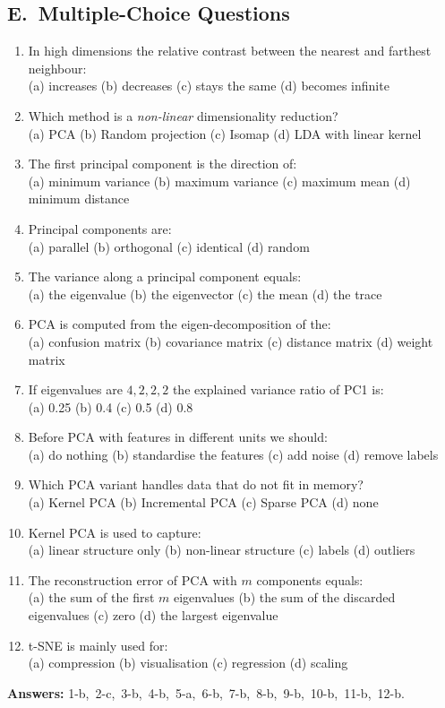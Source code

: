 \subsection*{E.\ Multiple-Choice Questions}
\begin{enumerate}
  \item In high dimensions the relative contrast between the nearest and farthest neighbour: \\
  (a) increases \quad (b) decreases \quad (c) stays the same \quad (d) becomes infinite
  \item Which method is a \emph{non-linear} dimensionality reduction? \\
  (a) PCA \quad (b) Random projection \quad (c) Isomap \quad (d) LDA with linear kernel
  \item The first principal component is the direction of: \\
  (a) minimum variance \quad (b) maximum variance \quad (c) maximum mean \quad (d) minimum distance
  \item Principal components are: \\
  (a) parallel \quad (b) orthogonal \quad (c) identical \quad (d) random
  \item The variance along a principal component equals: \\
  (a) the eigenvalue \quad (b) the eigenvector \quad (c) the mean \quad (d) the trace
  \item PCA is computed from the eigen-decomposition of the: \\
  (a) confusion matrix \quad (b) covariance matrix \quad (c) distance matrix \quad (d) weight matrix
  \item If eigenvalues are $4,2,2,2$ the explained variance ratio of PC1 is: \\
  (a) 0.25 \quad (b) 0.4 \quad (c) 0.5 \quad (d) 0.8
  \item Before PCA with features in different units we should: \\
  (a) do nothing \quad (b) standardise the features \quad (c) add noise \quad (d) remove labels
  \item Which PCA variant handles data that do not fit in memory? \\
  (a) Kernel PCA \quad (b) Incremental PCA \quad (c) Sparse PCA \quad (d) none
  \item Kernel PCA is used to capture: \\
  (a) linear structure only \quad (b) non-linear structure \quad (c) labels \quad (d) outliers
  \item The reconstruction error of PCA with $m$ components equals: \\
  (a) the sum of the first $m$ eigenvalues \quad (b) the sum of the discarded eigenvalues \quad (c) zero \quad (d) the largest eigenvalue
  \item t-SNE is mainly used for: \\
  (a) compression \quad (b) visualisation \quad (c) regression \quad (d) scaling
\end{enumerate}
\textbf{Answers:} 1-b,\ 2-c,\ 3-b,\ 4-b,\ 5-a,\ 6-b,\ 7-b,\ 8-b,\ 9-b,\ 10-b,\ 11-b,\ 12-b.

